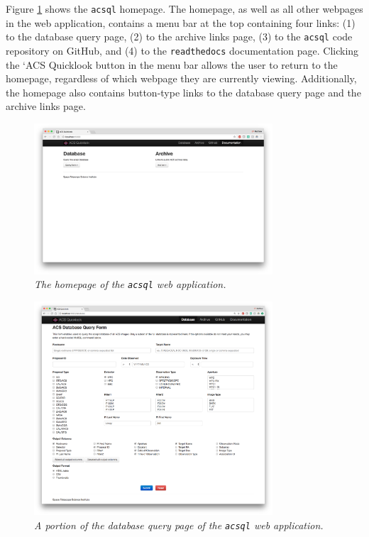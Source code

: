 \documentclass[10pt,journal,compsoc]{IEEEtran}
\begin{document}
Figure \ref{fig21} shows the \texttt{acsql} homepage.  The homepage, as well as all other webpages in the web application, contains a menu bar at the top containing four links:
(1) to the database query page, (2) to the archive links page, (3) to the \texttt{acsql} code repository on GitHub, and (4) to the \texttt{readthedocs} documentation page.  Clicking the
`ACS Quicklook button in the menu bar allows the user to return to the homepage, regardless of which webpage they are currently viewing.  Additionally, the homepage also contains button-type
links to the database query page and the archive links page.

\begin{figure}[!h]
\centering
\includegraphics[width=3.5in]{./figures/homepage.png}
\caption{\textit{The homepage of the \texttt{acsql} web application.}}
\label{fig21}
\end{figure}

\begin{figure}[!h]
\centering
\includegraphics[width=3.5in]{./figures/database_query_page.png}
\caption{\textit{A portion of the database query page of the \texttt{acsql} web application.}}
\label{fig22}
\end{figure}
\end{document}
